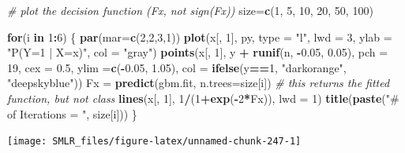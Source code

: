 \documentclass[
]{book}
\newenvironment{Shaded}{\begin{snugshade}}{\end{snugshade}}
\newcommand{\AttributeTok}[1]{\textcolor[rgb]{0.13,0.29,0.53}{#1}}
\newcommand{\CommentTok}[1]{\textcolor[rgb]{0.56,0.35,0.01}{\textit{#1}}}
\newcommand{\ControlFlowTok}[1]{\textcolor[rgb]{0.13,0.29,0.53}{\textbf{#1}}}
\newcommand{\DecValTok}[1]{\textcolor[rgb]{0.00,0.00,0.81}{#1}}
\newcommand{\FloatTok}[1]{\textcolor[rgb]{0.00,0.00,0.81}{#1}}
\newcommand{\FunctionTok}[1]{\textcolor[rgb]{0.13,0.29,0.53}{\textbf{#1}}}
\newcommand{\NormalTok}[1]{#1}
\newcommand{\OtherTok}[1]{\textcolor[rgb]{0.56,0.35,0.01}{#1}}
\newcommand{\SpecialCharTok}[1]{\textcolor[rgb]{0.81,0.36,0.00}{\textbf{#1}}}
\newcommand{\StringTok}[1]{\textcolor[rgb]{0.31,0.60,0.02}{#1}}
\theoremstyle{definition}
\theoremstyle{definition}
\theoremstyle{definition}
\theoremstyle{definition}
\theoremstyle{remark}
\begin{document}
\begin{Shaded}
\begin{Highlighting}[]
  \CommentTok{\# plot the decision function (Fx, not sign(Fx))}
\NormalTok{  size}\OtherTok{=}\FunctionTok{c}\NormalTok{(}\DecValTok{1}\NormalTok{, }\DecValTok{5}\NormalTok{, }\DecValTok{10}\NormalTok{, }\DecValTok{20}\NormalTok{, }\DecValTok{50}\NormalTok{, }\DecValTok{100}\NormalTok{)}

  \ControlFlowTok{for}\NormalTok{(i }\ControlFlowTok{in} \DecValTok{1}\SpecialCharTok{:}\DecValTok{6}\NormalTok{)}
\NormalTok{  \{}
    \FunctionTok{par}\NormalTok{(}\AttributeTok{mar=}\FunctionTok{c}\NormalTok{(}\DecValTok{2}\NormalTok{,}\DecValTok{2}\NormalTok{,}\DecValTok{3}\NormalTok{,}\DecValTok{1}\NormalTok{))}
    \FunctionTok{plot}\NormalTok{(x[, }\DecValTok{1}\NormalTok{], py, }\AttributeTok{type =} \StringTok{"l"}\NormalTok{, }\AttributeTok{lwd =} \DecValTok{3}\NormalTok{, }\AttributeTok{ylab =} \StringTok{"P(Y=1 | X=x)"}\NormalTok{, }\AttributeTok{col =} \StringTok{"gray"}\NormalTok{)}
    \FunctionTok{points}\NormalTok{(x[, }\DecValTok{1}\NormalTok{], y }\SpecialCharTok{+} \FunctionTok{runif}\NormalTok{(n, }\SpecialCharTok{{-}}\FloatTok{0.05}\NormalTok{, }\FloatTok{0.05}\NormalTok{), }\AttributeTok{pch =} \DecValTok{19}\NormalTok{, }\AttributeTok{cex =} \FloatTok{0.5}\NormalTok{, }\AttributeTok{ylim =}\FunctionTok{c}\NormalTok{(}\SpecialCharTok{{-}}\FloatTok{0.05}\NormalTok{, }\FloatTok{1.05}\NormalTok{),}
           \AttributeTok{col =} \FunctionTok{ifelse}\NormalTok{(y}\SpecialCharTok{==}\DecValTok{1}\NormalTok{, }\StringTok{"darkorange"}\NormalTok{, }\StringTok{"deepskyblue"}\NormalTok{))}
\NormalTok{    Fx }\OtherTok{=} \FunctionTok{predict}\NormalTok{(gbm.fit, }\AttributeTok{n.trees=}\NormalTok{size[i]) }\CommentTok{\# this returns the fitted function, but not class}
    \FunctionTok{lines}\NormalTok{(x[, }\DecValTok{1}\NormalTok{], }\DecValTok{1}\SpecialCharTok{/}\NormalTok{(}\DecValTok{1}\SpecialCharTok{+}\FunctionTok{exp}\NormalTok{(}\SpecialCharTok{{-}}\DecValTok{2}\SpecialCharTok{*}\NormalTok{Fx)), }\AttributeTok{lwd =} \DecValTok{1}\NormalTok{)}
    \FunctionTok{title}\NormalTok{(}\FunctionTok{paste}\NormalTok{(}\StringTok{"\# of Iterations = "}\NormalTok{, size[i]))}
\NormalTok{  \}}
\end{Highlighting}
\end{Shaded}

\begin{center}\texttt{[image: SMLR\_files/figure-latex/unnamed-chunk-247-1]} \end{center}
\end{document}
